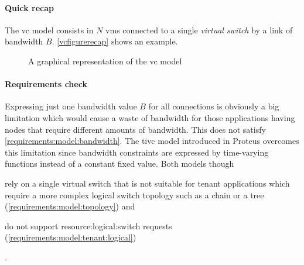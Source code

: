 \paragraph{Quick recap}
The \gls{vc} model consists in $N$ \glspl{vm} connected to a single \textit{virtual switch} by a link of bandwidth $B$.
\autoref{vcfigurerecap} shows an example.

\begin{figure}[!htb]
    \centering
    \usebox{\vcfigure}
    \caption{A graphical representation of the \gls{vc} model}
    \label{vcfigurerecap}
\end{figure}

\paragraph{Requirements check}
Expressing just one bandwidth value $B$ for all connections is obviously a big limitation which would cause a waste of bandwidth for those applications having nodes that require different amounts of bandwidth.
This does not satisfy \xmark \ref{requirements:model:bandwidth}.
The \gls{tivc} model introduced in Proteus \cite{proteus} overcomes this limitation since bandwidth constraints are expressed by time-varying functions instead of a constant fixed value.
Both models though 
\begin{mylist}
    \item rely on a single virtual switch that is not suitable for tenant applications which require a more complex logical switch topology such as a chain or a tree (\xmark \ref{requirements:model:topology}) and
    \item do not support \gls{resource:logical:switch} requests (\xmark \ref{requirements:model:tenant:logical})
\end{mylist}.

\begin{comment}
    \paragraph{A possible modification}
    Since specifying the same bandwidth demand $B$ for all \glspl{vm} is restrictive, one trivial solution could consist in allowing the model to specify different values of $B$, like depicted in \autoref{fig:vcmod}.
    
    \begin{figure}[!htb]
        \centering
        \usebox{\vcmodfigure}
        \caption{A possible \gls{vc} variant}
        \label{fig:vcmod}
    \end{figure}
    
    Still, the one-level tree topology remains a problem for those applications which require a more complex logical switch topology: regarding this, a natural \gls{vc} extension is the \gls{voc} model, hence leaving aside the former model in favor of the latter one.
\end{comment}